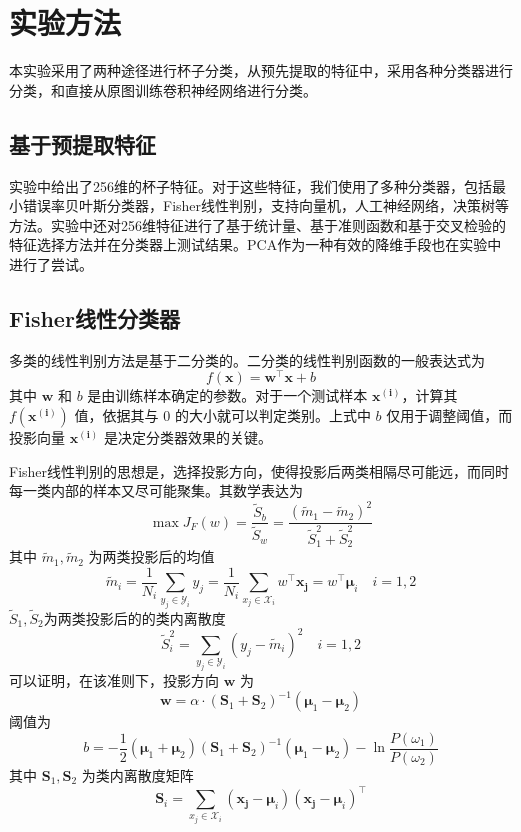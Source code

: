 \section{实验方法}
本实验采用了两种途径进行杯子分类，从预先提取的特征中，采用各种分类器进行分类，和直接从原图训练卷积神经网络进行分类。

\subsection{基于预提取特征}
实验中给出了256维的杯子特征。对于这些特征，我们使用了多种分类器，包括最小错误率贝叶斯分类器，{\ttfamily Fisher}线性判别，支持向量机，人工神经网络，决策树等方法。实验中还对256维特征进行了基于统计量、基于准则函数和基于交叉检验的特征选择方法并在分类器上测试结果。{\ttfamily PCA}作为一种有效的降维手段也在实验中进行了尝试。

\subsection{Fisher线性分类器}
	多类的线性判别方法是基于二分类的。二分类的线性判别函数的一般表达式为
	\begin{equation}
	f(\mathbf{x}) = \mathbf{w}^\top \mathbf{x} + b
	\label{eq:LDA}
	\end{equation}
	其中 $\mathbf{w}$ 和 $b$ 是由训练样本确定的参数。对于一个测试样本 $\mathbf{x^{(i)}}$，计算其 $f(\mathbf{x^{(i)}})$ 值，依据其与 $0$ 的大小就可以判定类别。上式中 $b$ 仅用于调整阈值，而投影向量 $\mathbf{x^{(i)}}$ 是决定分类器效果的关键。

	Fisher线性判别的思想是，选择投影方向，使得投影后两类相隔尽可能远，而同时每一类内部的样本又尽可能聚集。其数学表达为
	\begin{equation}
	\max J_F(w)=\frac{\tilde{S}_b}{\tilde{S}_w}=\frac{(\tilde{m}_1-\tilde{m}_2)^2}{\tilde{S}_1^2+\tilde{S}_2^2}
	\end{equation}
	其中 $\tilde{m}_1, \tilde{m}_2$ 为两类投影后的均值
	\begin{equation}
	\tilde{m}_i=\frac1{N_i}\sum_{y_j\in \mathcal{Y}_i}y_j=\frac1{N_i}\sum_{x_j\in \mathcal{X}_i}w^\top\boldsymbol{x_j}=w^\top\boldsymbol{\mu}_i\quad i=1,2
	\end{equation}
	$\tilde{S}_1, \tilde{S}_2$为两类投影后的的类内离散度
	\begin{equation}
	\tilde{S}_i^2=\sum_{y_j\in \mathcal{Y}_i}(y_j-\tilde{m}_i)^2\quad i=1,2
	\end{equation}
	可以证明，在该准则下，投影方向 $\mathbf{w}$ 为
	\begin{equation}
	\mathbf{w} = \alpha \cdot (\mathbf{S}_1 + \mathbf{S}_2)^{-1} (\boldsymbol{\mu}_1 - \boldsymbol{\mu}_2)
	\end{equation}
	阈值为
	\begin{equation}
	b = -\frac12(\boldsymbol{\mu}_1 + \boldsymbol{\mu}_2)(\mathbf{S}_1 + \mathbf{S}_2)^{-1} (\boldsymbol{\mu}_1 - \boldsymbol{\mu}_2)-\ln\frac{P(\omega_1)}{P(\omega_2)}
	\end{equation}
	其中 $\mathbf{S}_1, \mathbf{S}_2$ 为类内离散度矩阵
	\begin{equation}
	\mathbf{S}_i=\sum_{x_j\in \mathcal{X}_i}(\boldsymbol{x_j}-\boldsymbol{\mu}_i)(\boldsymbol{x_j}-\boldsymbol{\mu}_i)^\top
	\end{equation}

